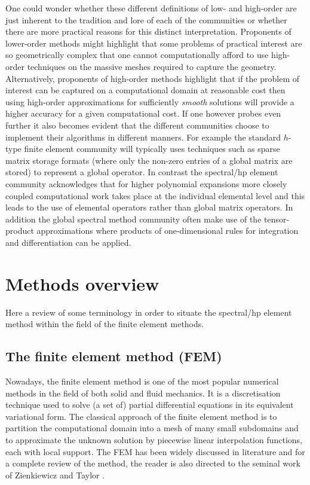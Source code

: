 One could wonder whether these different definitions of low- and high-order are
just inherent to the tradition and lore of each of the communities or whether
there are more practical reasons for this distinct interpretation. Proponents of
lower-order methods might highlight that some problems of practical interest are
so geometrically complex that one cannot computationally afford to use
high-order techniques on the massive meshes required to capture the geometry.
Alternatively, proponents of high-order methods highlight that if the problem of
interest can be captured on a computational domain at reasonable cost then using
high-order approximations for sufficiently \emph{smooth} solutions will provide
a higher accuracy for a given computational cost. If one however probes even
further it also becomes evident that the different communities choose to
implement their algorithms in different manners. For example the standard
$h$-type finite element community will typically uses techniques such as
sparse matrix storage formats (where only the non-zero entries of a global
matrix are stored) to represent a global operator. In contrast the spectral/hp
element community acknowledges that for higher polynomial expansions more
closely coupled computational work takes place at the individual elemental level
and this leads to the use of elemental operators rather than global matrix
operators. In addition the global spectral method community often make use of
the tensor-product approximations where products of one-dimensional rules for
integration and differentiation can be applied.

\section{Methods overview}

Here a review of some terminology in order to situate the spectral/hp element
method within the field of the finite element methods.

\subsection{The finite element method (FEM)}

Nowadays, the finite element method is one of the most popular numerical methods
in the field of both solid and fluid mechanics. It is a discretisation technique
used to solve (a set of) partial differential equations in its equivalent
variational form. The classical approach of the finite element method is to
partition the computational domain into a mesh of many small subdomains and to
approximate the unknown solution by piecewise linear interpolation functions,
each with local support. The FEM has been widely discussed in literature and for
a complete review of the method, the reader is also directed to the seminal work
of Zienkiewicz and Taylor \cite{ZiTa89}.

